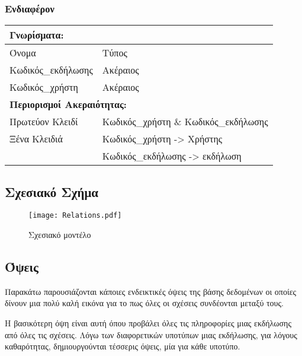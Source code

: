 \subsubsection*{Ενδιαφέρον}

\begin{tabular}{|p{6cm}|p{8cm}|}
  \multicolumn{2}{l}{\textbf{Γνωρίσματα:}}                   \\ \hline
  Όνομα              & Τύπος                                 \\ \hline
  Κωδικός\_εκδήλωσης & Ακέραιος                              \\ \hline
  Κωδικός\_χρήστη    & Ακέραιος                              \\ \hline
  \multicolumn{2}{l}{\textbf{Περιορισμοί Ακεραιότητας:}}     \\ \hline
  Πρωτεύον Κλειδί    & Κωδικός\_χρήστη \& Κωδικός\_εκδήλωσης \\ \hline
  Ξένα Κλειδιά       & Κωδικός\_χρήστη -> Χρήστης            \\ \hline
                     & Κωδικός\_εκδήλωσης -> εκδήλωση        \\ \hline
\end{tabular}

\subsection{Σχεσιακό Σχήμα}

\begin{figure}[H]
  \centering
  \texttt{[image: Relations.pdf]}
  \caption{Σχεσιακό μοντέλο}
\end{figure}

\subsection{Όψεις}

Παρακάτω παρουσιάζονται κάποιες ενδεικτικές όψεις της βάσης δεδομένων
οι οποίες δίνουν μια πολύ καλή εικόνα για το πως όλες οι σχέσεις
συνδέονται μεταξύ τους.

Η βασικότερη όψη είναι αυτή όπου προβάλει όλες τις πληροφορίες μιας
εκδήλωσης από όλες τις σχέσεις. Λόγω των διαφορετικών υποτύπων μιας
εκδήλωσης, για λόγους καθαρότητας, δημιουργούνται τέσσερις όψεις, μία
για κάθε υποτύπο.

